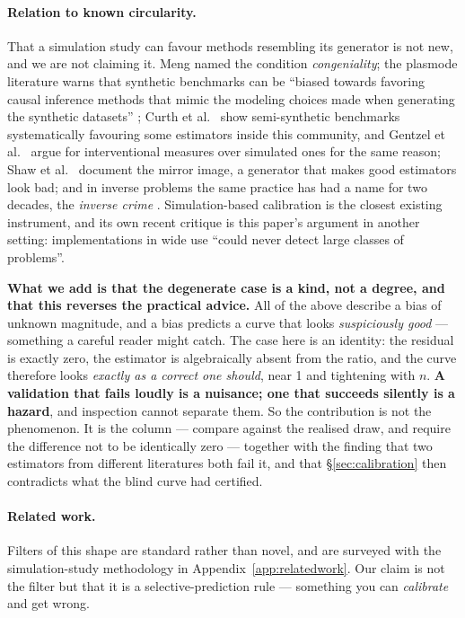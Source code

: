 \paragraph{Relation to known circularity.} That a simulation study can favour
methods resembling its generator is not new, and we are not claiming it. Meng
\citep{meng1994} named the condition \emph{congeniality}; the plasmode
literature warns that synthetic benchmarks can be ``biased towards favoring
causal inference methods that mimic the modeling choices made when generating
the synthetic datasets'' \citep{franklin2014}; Curth et al.~\citep{curth2021}
show semi-synthetic benchmarks systematically favouring some estimators inside
this community, and Gentzel et al.~\citep{gentzel2019} argue for interventional
measures over simulated ones for the same reason; Shaw et al.~\citep{shaw2026} document the mirror image, a
generator that makes good estimators look bad; and in inverse problems the same
practice has had a name for two decades, the \emph{inverse crime}
\citep{wirgin2004,kaipio2007}. Simulation-based calibration
\citep{talts2018} is the closest existing instrument, and its own recent
critique \citep{modrak2025} is this paper's argument in another setting:
implementations in wide use ``could never detect large classes of problems''.

\textbf{What we add is that the degenerate case is a kind, not a degree, and
that this reverses the practical advice.} All of the above describe a bias of
unknown magnitude, and a bias predicts a curve that looks \emph{suspiciously
good} --- something a careful reader might catch. The case here is an identity:
the residual is exactly zero, the estimator is algebraically absent from the
ratio, and the curve therefore looks \emph{exactly as a correct one should},
near 1 and tightening with $n$. \textbf{A validation that fails loudly is a
nuisance; one that succeeds silently is a hazard}, and inspection cannot
separate them. So the contribution is not the phenomenon. It is the column ---
compare against the realised draw, and require the difference not to be
identically zero --- together with the finding that two estimators from
different literatures both fail it, and that
\S\ref{sec:calibration} then contradicts what the blind curve had certified.

\else
\paragraph{Related work.} Filters of this shape are standard rather than novel,
and are surveyed with the simulation-study methodology in
Appendix~\ref{app:relatedwork}. Our claim is not the filter but that it is a
selective-prediction rule \citep{chow1970,geifman2017} --- something you can
\emph{calibrate} and get wrong.
\fi

